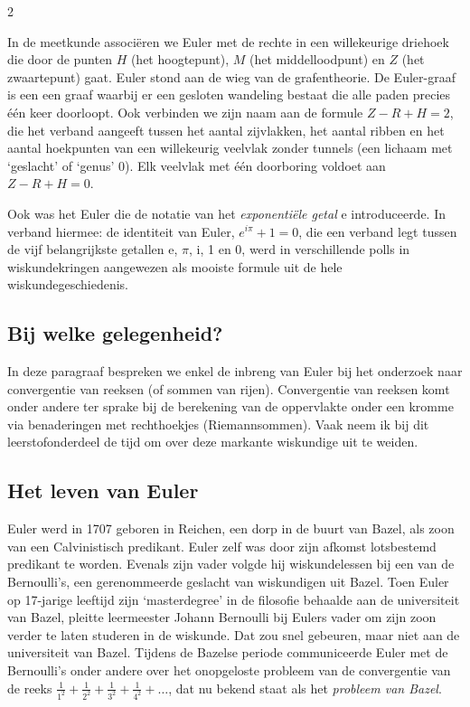 \begin{multicols}{2}
	
	In de meetkunde associëren we Euler met de rechte in een willekeurige driehoek die door de punten $H$ (het hoogtepunt), $M$ (het middelloodpunt) en $Z$ (het zwaartepunt) gaat. Euler stond aan de wieg van de grafentheorie. De Euler-graaf is een een graaf waarbij er een gesloten wandeling bestaat die alle paden precies één keer doorloopt. Ook verbinden we zijn naam aan de formule $Z-R+H=2$, die het verband aangeeft tussen het aantal zijvlakken, het aantal ribben en het aantal hoekpunten van een willekeurig veelvlak zonder tunnels (een lichaam met `geslacht' of `genus' 0). Elk veelvlak met één doorboring voldoet aan  $Z-R+H=0$.
	
	Ook was het Euler die de notatie van het \emph{exponentiële getal} e introduceerde. In verband hiermee: de identiteit van Euler, $e^{i\pi}+1=0$, die een verband legt tussen de vijf belangrijkste getallen e, $\pi$, i, 1 en 0, werd in verschillende polls in wiskundekringen aangewezen als mooiste formule uit de hele wiskundegeschiedenis.
	
	\subsection*{Bij welke gelegenheid?}
	
	In deze paragraaf bespreken we enkel de inbreng van Euler bij het onderzoek naar convergentie van reeksen (of sommen van rijen). Convergentie van reeksen komt onder andere ter sprake bij de berekening van de oppervlakte onder een kromme via  benaderingen met rechthoekjes (Riemannsommen). Vaak neem ik bij dit leerstofonderdeel de tijd om over deze markante wiskundige uit te weiden.
	
	\subsection*{Het leven van Euler}
	
	Euler werd in 1707 geboren in Reichen, een dorp in de buurt van Bazel, als zoon van een Calvinistisch predikant. Euler zelf was door zijn afkomst lotsbestemd predikant te worden. Evenals zijn vader volgde hij wiskundelessen bij een van de Bernoulli's, een gerenommeerde geslacht van wiskundigen uit Bazel. Toen Euler op 17-jarige leeftijd zijn `masterdegree' in de filosofie behaalde aan de universiteit van Bazel, pleitte leermeester Johann Bernoulli bij Eulers vader om zijn zoon verder te laten studeren in de wiskunde. Dat zou snel gebeuren, maar niet aan de universiteit van Bazel. Tijdens de Bazelse periode communiceerde Euler met de Bernoulli's onder andere over het onopgeloste probleem van de convergentie van de reeks $\frac{1}{1^2}+\frac{1}{2^2}+\frac{1}{3^2}+\frac{1}{4^2}+ \dots $, dat nu bekend staat als het \emph{probleem van Bazel}.
	

\end{multicols}
